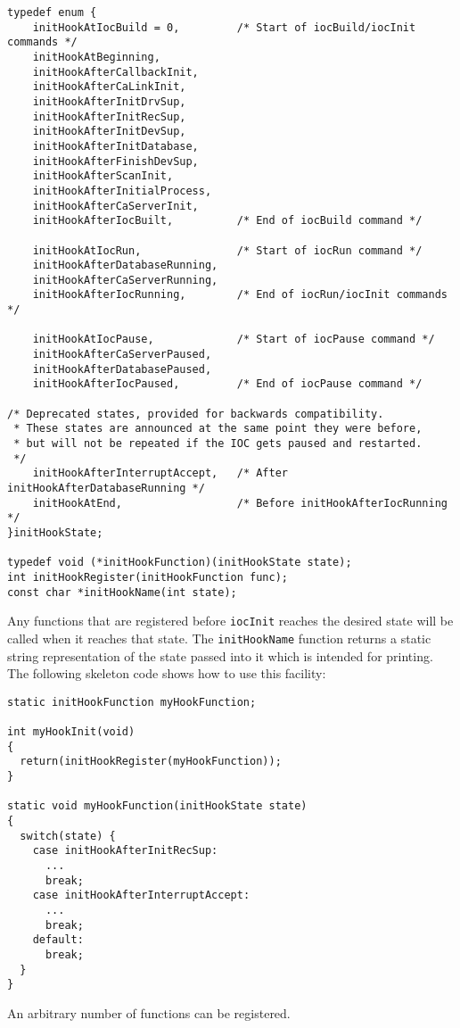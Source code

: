 \begin{verbatim}typedef enum {
    initHookAtIocBuild = 0,         /* Start of iocBuild/iocInit commands */
    initHookAtBeginning,
    initHookAfterCallbackInit,
    initHookAfterCaLinkInit,
    initHookAfterInitDrvSup,
    initHookAfterInitRecSup,
    initHookAfterInitDevSup,
    initHookAfterInitDatabase,
    initHookAfterFinishDevSup,
    initHookAfterScanInit,
    initHookAfterInitialProcess,
    initHookAfterCaServerInit,
    initHookAfterIocBuilt,          /* End of iocBuild command */

    initHookAtIocRun,               /* Start of iocRun command */
    initHookAfterDatabaseRunning,
    initHookAfterCaServerRunning,
    initHookAfterIocRunning,        /* End of iocRun/iocInit commands */

    initHookAtIocPause,             /* Start of iocPause command */
    initHookAfterCaServerPaused,
    initHookAfterDatabasePaused,
    initHookAfterIocPaused,         /* End of iocPause command */

/* Deprecated states, provided for backwards compatibility.
 * These states are announced at the same point they were before,
 * but will not be repeated if the IOC gets paused and restarted.
 */
    initHookAfterInterruptAccept,   /* After initHookAfterDatabaseRunning */
    initHookAtEnd,                  /* Before initHookAfterIocRunning */
}initHookState;

typedef void (*initHookFunction)(initHookState state);
int initHookRegister(initHookFunction func);
const char *initHookName(int state);
\end{verbatim}
Any functions that are registered before \verb|iocInit| reaches the desired state will be called when it reaches that state. The 
\verb|initHookName| function returns a static string representation of the state passed into it which is intended for printing. 
The following skeleton code shows how to use this facility:

\begin{verbatim}static initHookFunction myHookFunction;

int myHookInit(void)
{
  return(initHookRegister(myHookFunction));
}

static void myHookFunction(initHookState state)
{
  switch(state) {
    case initHookAfterInitRecSup:
      ...
      break;
    case initHookAfterInterruptAccept:
      ...
      break;
    default:
      break;
  }
}
\end{verbatim}An arbitrary number of functions can be registered.

